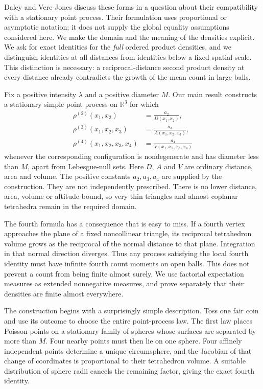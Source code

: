 \documentclass[11pt,a4paper]{article}
\numberwithin{equation}{section}
\theoremstyle{definition}
\theoremstyle{remark}
\newcommand{\R}{\mathbb R}
\begin{document}
Daley and Vere-Jones \cite[Exercise 12.6.11]{DVJ2008} discuss these forms in
a question about their compatibility with a stationary point process.
Their formulation uses proportional or asymptotic notation; it does not
supply the global equality assumptions considered here. We make the domain
and the meaning of the densities explicit. We ask for exact identities for
the \emph{full} ordered product densities, and we distinguish identities at
all distances from identities below a fixed spatial scale. This distinction
is necessary: a reciprocal-distance second product density at every
distance already contradicts the growth of the mean count in large balls.

Fix a positive intensity $\lambda$ and a positive diameter $M$. Our main
result constructs a stationary simple point process on $\R^3$ for which
\[
 \begin{aligned}
 \rho^{(2)}(x_1,x_2)&=\frac{a_2}{D(x_1,x_2)},\\
 \rho^{(3)}(x_1,x_2,x_3)&=\frac{a_3}{A(x_1,x_2,x_3)},\\
 \rho^{(4)}(x_1,x_2,x_3,x_4)&=\frac{a_4}{V(x_1,x_2,x_3,x_4)}
 \end{aligned}
\]
whenever the corresponding configuration is nondegenerate and has diameter
less than $M$, apart from Lebesgue-null sets. Here $D$, $A$ and $V$ are
ordinary distance, area and volume. The positive constants $a_2,a_3,a_4$
are supplied by the construction. They are not independently prescribed.
There is no lower distance, area, volume or altitude bound, so very thin
triangles and almost coplanar tetrahedra remain in the required domain.

The fourth formula has a consequence that is easy to miss. If a fourth
vertex approaches the plane of a fixed noncollinear triangle, its
reciprocal tetrahedron volume grows as the reciprocal of the normal
distance to that plane. Integration in that normal direction diverges.
Thus any process satisfying the local fourth identity must have infinite
fourth count moments on open balls. This does not prevent a count from
being finite almost surely. We use factorial expectation measures as
extended nonnegative measures, and prove separately that their densities
are finite almost everywhere.

The construction begins with a surprisingly simple description. Toss one
fair coin and use its outcome to choose the entire point-process law.
The first law places Poisson points on a stationary family of spheres
whose surfaces are separated by more than $M$. Four nearby points must
then lie on one sphere. Four affinely independent points determine a
unique circumsphere, and the Jacobian of that change of coordinates is
proportional to their tetrahedron volume. A suitable distribution of sphere
radii cancels the remaining factor, giving the exact fourth identity.
\end{document}
